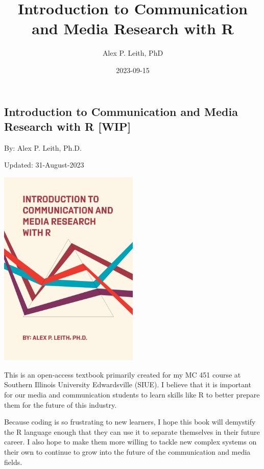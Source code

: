 \documentclass[
  b5paper]{book}
\title{Introduction to Communication and Media Research with R}
\author{Alex P. Leith, PhD}
\date{2023-09-15}
\begin{document}
\maketitle

{
\setcounter{tocdepth}{1}
\tableofcontents
}
\hypertarget{section}{%
\chapter*{}\label{section}}

\hypertarget{introduction-to-communication-and-media-research-with-r-wip}{%
\section*{Introduction to Communication and Media Research with R {[}WIP{]}}\label{introduction-to-communication-and-media-research-with-r-wip}}

By: Alex P. Leith, Ph.D.

Updated: 31-August-2023

\href{Current\%20Book\%20Cover\%20(Art\%20created\%20with\%20R\textquotesingle{}s\%20aRtsy\%20package)}{\includegraphics[width=0.5\textwidth,height=\textheight]{cover_2.png}}

This is an open-access textbook primarily created for my MC 451 course at Southern Illinois University Edwardsville (SIUE). I believe that it is important for our media and communication students to learn skills like R to better prepare them for the future of this industry.

Because coding is so frustrating to new learners, I hope this book will demystify the R language enough that they can use it to separate themselves in their future career. I also hope to make them more willing to tackle new complex systems on their own to continue to grow into the future of the communication and media fields.
\end{document}

